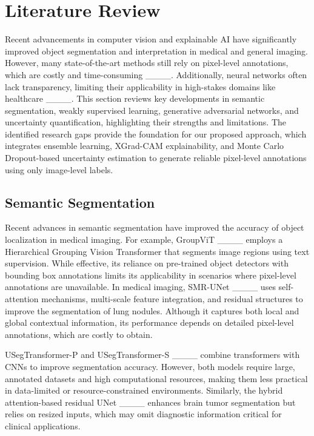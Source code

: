 \section{Literature Review}
Recent advancements in computer vision and explainable AI have significantly improved object segmentation and interpretation in medical and general imaging. However, many state-of-the-art methods still rely on pixel-level annotations, which are costly and time-consuming ____. Additionally, neural networks often lack transparency, limiting their applicability in high-stakes domains like healthcare ____. This section reviews key developments in semantic segmentation, weakly supervised learning, generative adversarial networks, and uncertainty quantification, highlighting their strengths and limitations. The identified research gaps provide the foundation for our proposed approach, which integrates ensemble learning, XGrad-CAM explainability, and Monte Carlo Dropout-based uncertainty estimation to generate reliable pixel-level annotations using only image-level labels.

\subsection{Semantic Segmentation}

Recent advances in semantic segmentation have improved the accuracy of object localization in medical imaging. For example, GroupViT ____ employs a Hierarchical Grouping Vision Transformer that segments image regions using text supervision. While effective, its reliance on pre-trained object detectors with bounding box annotations limits its applicability in scenarios where pixel-level annotations are unavailable. In medical imaging, SMR-UNet ____ uses self-attention mechanisms, multi-scale feature integration, and residual structures to improve the segmentation of lung nodules. Although it captures both local and global contextual information, its performance depends on detailed pixel-level annotations, which are costly to obtain.

USegTransformer-P and USegTransformer-S ____ combine transformers with CNNs to improve segmentation accuracy. However, both models require large, annotated datasets and high computational resources, making them less practical in data-limited or resource-constrained environments. Similarly, the hybrid attention-based residual UNet ____ enhances brain tumor segmentation but relies on resized inputs, which may omit diagnostic information critical for clinical applications.

